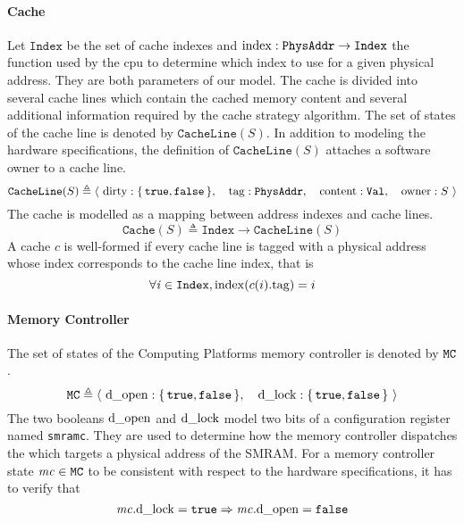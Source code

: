 \paragraph{Cache}
%
Let $\texttt{Index}$ be the set of cache indexes and
$\mathrm{index} : \texttt{PhysAddr} \rightarrow \texttt{Index}$ the function used
by the \ac{cpu} to determine which index to use for a given physical address.
%
They are both parameters of our model.
%
The cache is divided into several cache lines which contain the cached memory
content and several additional information required by the cache strategy
algorithm.
%
The set of states of the cache line is denoted by $\texttt{CacheLine}(S)$.
%
In addition to modeling the hardware specifications, the definition of
$\texttt{CacheLine}(S)$ attaches a software owner to a cache line.
%
\[
  \texttt{CacheLine}(S) \triangleq \langle~\mathrm{dirty} :
  \{\,\mathtt{true}, \mathtt{false}\,\},\quad\mathrm{tag} :
  \texttt{PhysAddr},\quad\mathrm{content}: \texttt{Val},\quad\mathrm{owner}:
  S~\rangle
\]
%
The cache is modelled as a mapping between address indexes and cache lines.
%
\[
  \texttt{Cache}(S) \triangleq \texttt{Index} \rightarrow \texttt{CacheLine}(S)
\]
%
A cache $c$ is well-formed if every cache line is tagged with a physical address
whose index corresponds to the cache line index, that is
%
\[
  \forall \mathit{i} \in \texttt{Index}, \mathrm{index}(c(i).\mathrm{tag}) = i
\]

\paragraph{Memory Controller}
%
The set of states of the  Computing Platforms memory
controller is denoted by $\mathtt{MC}$.
%
\[
  \texttt{MC} \triangleq \langle~\mathrm{d\_open}: \{\,\mathtt{true},
    \mathtt{false}\,\},\quad\mathrm{d\_lock}: \{\,\mathtt{true},
    \mathtt{false}\,\}~\rangle
\]
%
The two booleans $\mathrm{d\_open}$ and $\mathrm{d\_lock}$ model two bits of a
configuration register named \texttt{smramc}.
%
They are used to determine how the memory controller dispatches the \IO which
targets a physical address of the SMRAM.
%
For a memory controller state $\mathit{mc} \in \texttt{MC}$ to be consistent with
respect to the hardware specifications, it has to verify that
%
\[
  \mathit{mc}.\mathrm{d\_lock} = \mathtt{true} \Rightarrow \mathit{mc}.\mathrm{d\_open} =
  \mathtt{false}
\]


